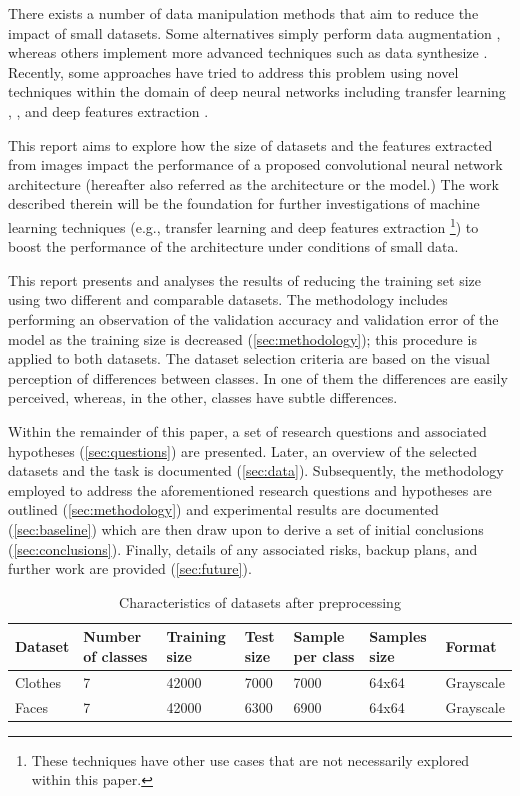 \documentclass{article}
\begin{document}
There exists a number of data manipulation methods that aim to reduce the impact of small datasets. Some alternatives simply perform data augmentation \cite{krizhevsky2012imagenet}, whereas others implement more advanced techniques such as data synthesize \cite{hu2018frankenstein}. Recently, some approaches have tried to address this problem using novel techniques within the domain of deep neural networks including transfer learning \citep{ng2015deep}, \cite{oquab2014learning}, and deep features extraction \citep{chen2016deep}.

This report aims to explore how the size of datasets and the features extracted from images impact the performance of a proposed convolutional neural network architecture (hereafter also referred as the architecture or the model.) The work described therein will be the foundation for further investigations of machine learning techniques (e.g., transfer learning and deep features extraction \footnote{These techniques have other use cases that are not necessarily explored within this paper.}) to boost the performance of the architecture under conditions of small data.

This report presents and analyses the results of reducing the training set size using two different and comparable datasets. The methodology includes performing an observation of the validation accuracy and validation error of the model as the training size is decreased (\ref{sec:methodology}); this procedure is applied to both datasets. The dataset selection criteria are based on the visual perception of differences between classes. In one of them the differences are easily perceived, whereas, in the other, classes have subtle differences.

Within the remainder of this paper, a set of research questions and associated hypotheses (\ref{sec:questions}) are presented. Later, an overview of the selected datasets and the task is documented (\ref{sec:data}). Subsequently, the methodology employed to address the aforementioned research questions and hypotheses are outlined (\ref{sec:methodology}) and experimental results are documented (\ref{sec:baseline}) which are then draw upon to derive a set of initial conclusions (\ref{sec:conclusions}). Finally, details of any associated risks, backup plans, and further work are provided (\ref{sec:future}).


 
\begin{table}[!htb]
  \centering
  \begin{tabular}{| l | l | l | l | l | l | l |}
    \hline
    \textbf{Dataset} & \textbf{Number of classes} & \textbf{Training size} & \textbf{Test size}  &  \textbf{Sample per class} & \textbf{Samples size} & \textbf{Format} \\ \hline
    Clothes & 7 & 42000 & 7000 & 7000 & 64x64 & Grayscale\\ \hline
    Faces & 7 & 42000 & 6300 & 6900 & 64x64 & Grayscale\\ \hline
  \end{tabular}
  \caption{Characteristics of datasets after preprocessing}
  \label{tab:1}
\end{table}
\end{document}
